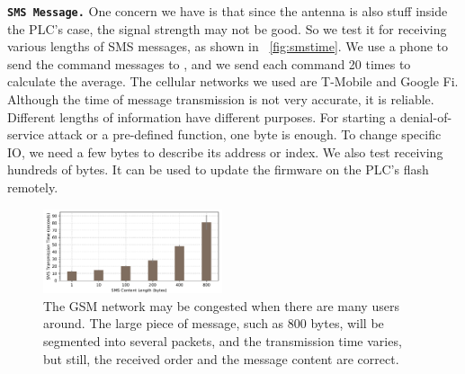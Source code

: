 %


\texttt{\textbf{SMS Message.}} One concern we have is that since the antenna is also stuff inside the PLC's case, the signal strength may not be good. So we test it for receiving various lengths of SMS messages, as shown in ~\autoref{fig:smstime}. We use a phone to send the command messages to \name, and we send each command 20 times to calculate the average. The cellular networks we used are T-Mobile and Google Fi. Although the time of message transmission is not very accurate, it is reliable. Different lengths of information have different purposes. For starting a denial-of-service attack or a pre-defined function, one byte is enough. To change specific IO, we need a few bytes to describe its address or index. We also test receiving hundreds of bytes. It can be used to update the firmware on the PLC's flash remotely.

\begin{figure}[th]
	\includegraphics[width=0.47\textwidth]{figures/smstime}
	\centering
	\caption{The GSM network may be congested when there are many users around. The large piece of message, such as 800 bytes, will be segmented into several packets, and the transmission time varies, but still, the received order and the message content are correct.}
	\label{fig:smstime}
\end{figure}

